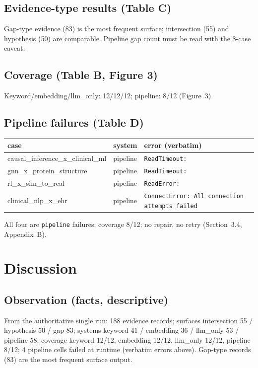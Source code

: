 \documentclass[11pt]{article}
\begin{document}
\subsection{Evidence-type results (Table C)}
Gap-type evidence (83) is the most frequent surface; intersection (55) and
hypothesis (50) are comparable. Pipeline gap count must be read with the 8-case
caveat.

\subsection{Coverage (Table B, Figure 3)}
Keyword/embedding/llm\_only: 12/12/12; pipeline: 8/12 (Figure~3).

\subsection{Pipeline failures (Table D)}
\begin{center}
\begin{tabular}{lll}
\toprule
\textbf{case} & \textbf{system} & \textbf{error (verbatim)} \\
\midrule
causal\_inference\_x\_clinical\_ml & pipeline & \texttt{ReadTimeout: } \\
gnn\_x\_protein\_structure & pipeline & \texttt{ReadTimeout: } \\
rl\_x\_sim\_to\_real & pipeline & \texttt{ReadError: } \\
clinical\_nlp\_x\_ehr & pipeline & \texttt{ConnectError: All connection attempts failed} \\
\bottomrule
\end{tabular}
\end{center}
All four are \texttt{pipeline} failures; coverage 8/12; no repair, no retry
(Section~3.4, Appendix~B).

\section{Discussion}
\label{sec:disc}

\subsection{Observation (facts, descriptive)}
From the authoritative single run: 188 evidence records; surfaces intersection
55 / hypothesis 50 / gap 83; systems keyword 41 / embedding 36 / llm\_only 53 /
pipeline 58; coverage keyword 12/12, embedding 12/12, llm\_only 12/12, pipeline
8/12; 4 pipeline cells failed at runtime (verbatim errors above).
Gap-type records (83) are the most frequent surface output.
\end{document}
